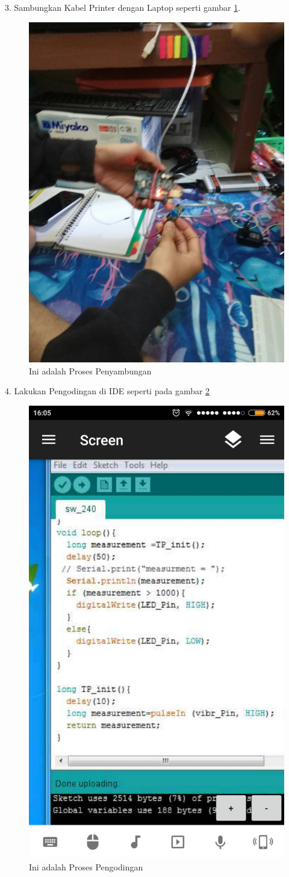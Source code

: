  3. Sambungkan Kabel Printer dengan Laptop seperti gambar \ref{ar7}.
  \begin{figure}[ht]
  \centerline{\includegraphics[width=.75\textwidth]{figures/ar7.jpg}}
  \caption{Ini adalah Proses Penyambungan}
  \label{ar7}
  \end{figure}

 4. Lakukan Pengodingan di IDE seperti pada gambar \ref{ar8}
  \begin{figure}[ht]
  \centerline{\includegraphics[width=.75\textwidth]{figures/ar8.jpg}}
  \caption{Ini adalah Proses Pengodingan}
  \label{ar8}
  \end{figure}

																											